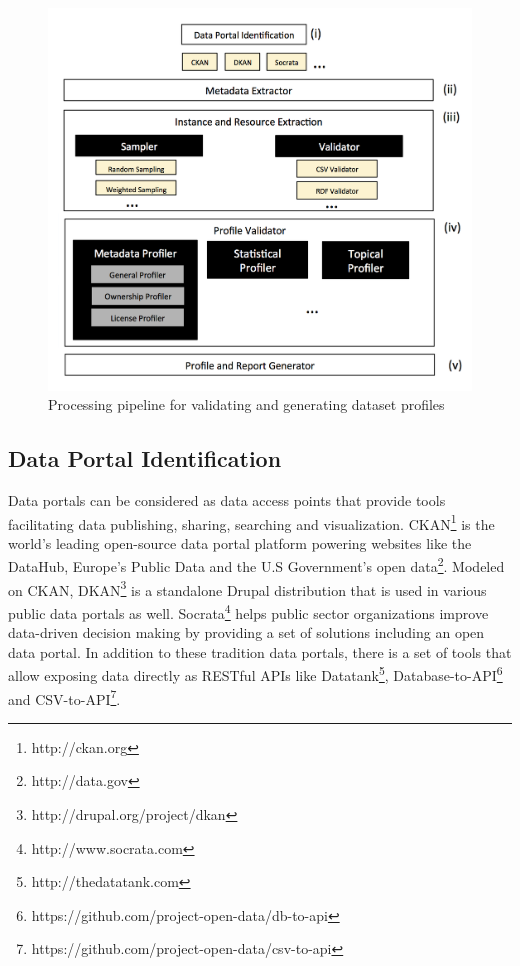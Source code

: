\documentclass[runningheads,a4paper]{llncs}
\begin{document}
\begin{figure}[h!]
  \centering
    \includegraphics[scale=0.4]{figure-1_architecture.png}
  \caption{Processing pipeline for validating and generating dataset profiles}
\end{figure}

\subsection{Data Portal Identification}

Data portals can be considered as data access points that provide tools facilitating data publishing, sharing, searching and visualization. CKAN\footnote{http://ckan.org} is the world's leading open-source data portal platform powering websites like the DataHub, Europe's Public Data and the U.S Government's open data\footnote{http://data.gov}. Modeled on CKAN, DKAN\footnote{http://drupal.org/project/dkan} is a standalone Drupal distribution that is used in various public data portals as well. Socrata\footnote{http://www.socrata.com} helps public sector organizations improve data-driven decision making by providing a set of solutions including an open data portal. In addition to these tradition data portals, there is a set of tools that allow exposing data directly as RESTful APIs like Datatank\footnote{http://thedatatank.com}, Database-to-API\footnote{https://github.com/project-open-data/db-to-api} and CSV-to-API\footnote{https://github.com/project-open-data/csv-to-api}.\\
\end{document}
